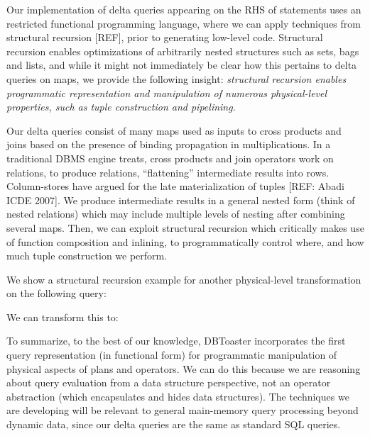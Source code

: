 {
Our implementation of delta queries appearing on the RHS of statements uses an
restricted functional programming language, where we can apply
techniques from structural recursion [REF], prior to generating low-level code. 
Structural recursion enables optimizations of arbitrarily nested structures such
as sets, bags and lists, and while it might not immediately be clear how this
pertains to delta queries on maps, we provide the following insight:
\textit{structural recursion enables programmatic representation and
manipulation of numerous physical-level properties, such as tuple
construction and pipelining}.

Our delta queries consist of many maps used as inputs to cross products and
joins based on the presence of binding propagation in multiplications. In a
traditional DBMS engine treats, cross products and join operators work on
relations, to produce relations, ``flattening'' intermediate results into rows.
Column-stores have argued for the late materialization of tuples [REF: Abadi
ICDE 2007]. We produce intermediate results in a general nested form (think of
nested relations) which may include multiple levels of nesting after combining
several maps. Then, we can exploit structural recursion which critically makes
use of function composition and inlining, to programmatically control where, and
how much tuple construction we perform.

We show a structural recursion example for another physical-level transformation
on the following query: 

We can transform this to:  

To summarize, to the best of our knowledge, DBToaster incorporates the first
query representation (in functional form) for programmatic manipulation of
physical aspects of plans and operators. We can do this because we are reasoning
about query evaluation from a data structure perspective, not an operator
abstraction (which encapsulates and hides data structures). The techniques we
are developing will be relevant to general main-memory query processing beyond
dynamic data, since our delta queries are the same as standard SQL queries.
}